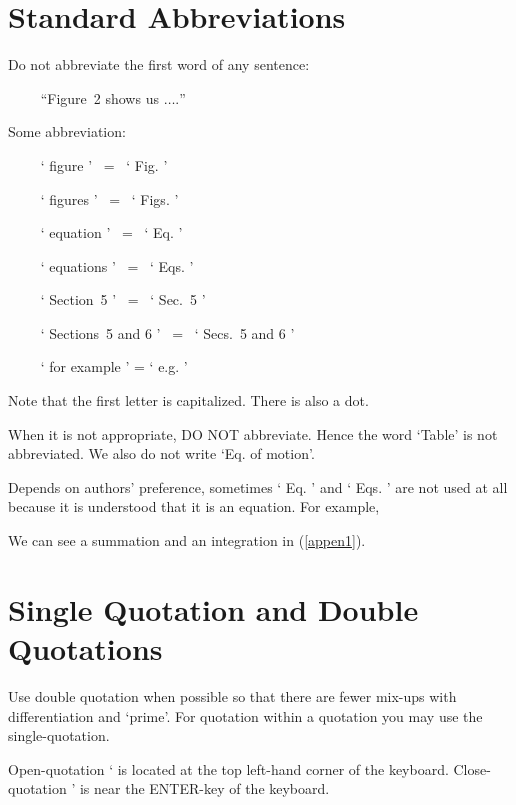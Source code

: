 \documentclass{ws-procs9x6}
\begin{document}
\section{Standard Abbreviations}
\begin{alphlist}[(d)]
\item Do not abbreviate the first word of any sentence: 

$ \qquad $ ``Figure~2 shows us $\ldots.$''

\item Some abbreviation:

$ \qquad $ ` figure ' $ \, $ = $ \, $  ` Fig. '

$ \qquad $ ` figures ' $ \, $ = $ \, $ ` Figs. '

$ \qquad $ ` equation ' $ \, $ = $ \, $ ` Eq. '

$ \qquad $ ` equations ' $ \, $ = $ \, $ ` Eqs. '

$ \qquad $ ` Section~5 ' $ \, $ = $ \, $ ` Sec.~5 '

$ \qquad $ ` Sections~5 and 6 ' $ \, $ = $ \, $ ` Secs.~5 and 6 '

$ \qquad $ ` for example ' = ` e.g. '

\noindent
Note that the first letter is capitalized. There is also a dot. 

\item When it is not appropriate, DO NOT abbreviate. Hence the word `Table'
is not abbreviated. We also do not write `Eq. of motion'.

\item Depends on authors' preference, sometimes ` Eq. ' and ` Eqs. '
are not used at all because it is understood that it is an equation.
For example,  

\begin{center}
We can see a summation and an integration in (\ref{appen1}).
\end{center}
\end{alphlist}

\section{Single Quotation and Double Quotations}
Use double quotation when possible so that there are fewer mix-ups with
differentiation and `prime'. For quotation within a 
quotation you may use the single-quotation.

Open-quotation ` is located at the top left-hand corner of the keyboard.
Close-quotation ' is near the ENTER-key of the keyboard.
\end{document}
